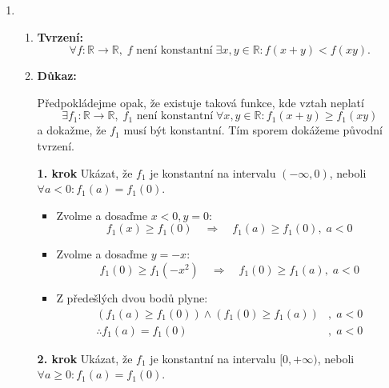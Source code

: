 \documentclass[12pt]{article}
\begin{document}
\begin{enumerate}
\begin{enumerate}
    \end{enumerate}




















  \item
    \begin{enumerate} 
      \item \textbf{Tvrzení:}
        \[
        \forall f : \mathbb{R} \to \mathbb{R},\; f \text{ není konstantní} \;
        \exists x, y \in \mathbb{R} : f(x + y) < f(xy).
        \]
        
        \bigskip
      \item \textbf{Důkaz:}

        Předpokládejme opak, že existuje taková funkce, kde vztah neplatí
        \[
        \exists f_1 : \mathbb{R} \to \mathbb{R},\; f_1 \text{ není konstantní} \;
        \forall x, y \in \mathbb{R} : f_1(x + y) \geq f_1(xy)
        \]
        a dokažme, že $f_1$ musí být konstantní. Tím sporem dokážeme původní tvrzení.

        \medskip
        \textbf{1. krok} Ukázat, že $f_1$ je konstantní na intervalu $(-\infty, 0)$, neboli $\forall a<0:f_1(a) = f_1(0)$.

        \begin{itemize}
          \item Zvolme a dosaďme $x<0,y=0$: 
          \[f_1(x) \geq f_1(0) \quad \Rightarrow \quad f_1(a) \geq f_1(0), \; a<0
          \]

          \item Zvolme a dosaďme $y=-x$: 
          \[f_1(0) \geq f_1(-x^2) \quad \Rightarrow \quad f_1(0) \geq f_1(a), \; a<0
          \]

          \item Z předešlých dvou bodů plyne:
          \begin{align*}
            ( f_1(a) \geq f_1(0) ) \land ( f_1(0) \geq f_1(a) )&, \; a<0 \\
            \therefore f_1(a) = f_1(0)&, \; a<0
          \end{align*}
        \end{itemize}

        \medskip
        \textbf{2. krok} Ukázat, že $f_1$ je konstantní na intervalu $[0, +\infty)$, neboli $\forall a\geq0:f_1(a) = f_1(0)$.


\end{enumerate}
\end{enumerate}
\end{document}
